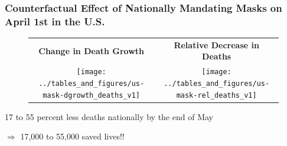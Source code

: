 \documentclass{beamer}
\def\ycolor{\color{red}}
\begin{document}
\begin{frame}
  \frametitle{Counterfactual Effect of Nationally Mandating Masks on April 1st in the U.S. }


\begin{figure}[ht]
  \begin{minipage}{\linewidth}
    \centering

    \begin{tabular}{cc}
      \textbf{Change in Death Growth} &  \textbf{Relative Decrease in Deaths}\\
      \texttt{[image: ../tables\_and\_figures/us-mask-dgrowth\_deaths\_v1]}
      &
        \texttt{[image: ../tables\_and\_figures/us-mask-rel\_deaths\_v1]}
    \end{tabular}
  \end{minipage}
\end{figure}

  17 to 55 percent less deaths nationally by the end of May
 
 $\Rightarrow$  {\ycolor 17,000 to 55,000  saved lives!!}

\end{frame}



\end{document}
